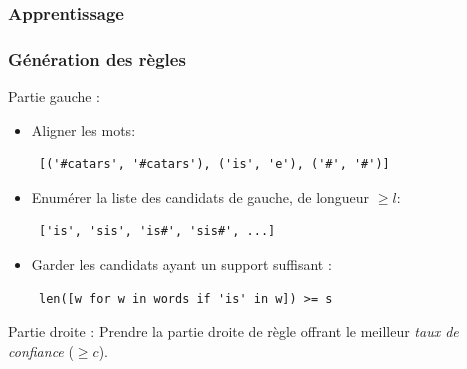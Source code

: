 \documentclass{beamer}
\begin{document}
%
%

\begin{frame}[fragile]
\frametitle{Apprentissage}
\frametitle{Génération des règles}

	\begin{block}{Partie gauche :}
	 	\begin{itemize}
	 	\item Aligner les mots:
            {\scriptsize \begin{verbatim} [('#catars', '#catars'), ('is', 'e'), ('#', '#')] \end{verbatim}}
	 	\item Enumérer la liste des candidats de gauche, de longueur $\geq l$:
            {\scriptsize \begin{verbatim} ['is', 'sis', 'is#', 'sis#', ...] \end{verbatim}}
	 	\item Garder les candidats ayant un support suffisant :
            {\scriptsize \begin{verbatim} len([w for w in words if 'is' in w]) >= s \end{verbatim}}
		\end{itemize}
	\end{block}
	
	\begin{block}{Partie droite :}
        Prendre la partie droite de règle offrant le meilleur \emph{taux de confiance} ($\geq c$).
	\end{block}		
\end{frame}
\end{document}
